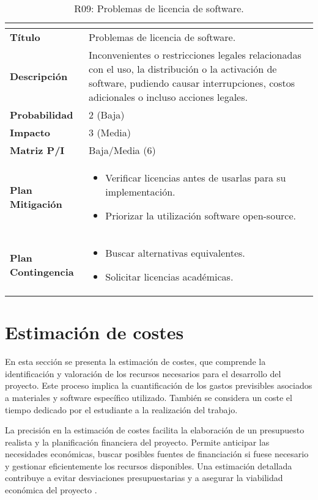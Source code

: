 \begin{table}[H]
\centering
\begin{tabular}{|>{\bfseries}l|p{10cm}|}
\hline
\rowcolor{lightgray}
\multicolumn{2}{|c|}{\textbf{Riesgo R09}} \\ \hline
Título & Problemas de licencia de software.\\ \hline
Descripción & Inconvenientes o restricciones legales relacionadas con el uso, la distribución o la activación de software, pudiendo causar interrupciones, costos adicionales o incluso acciones legales. \\ \hline
Probabilidad & 2 (Baja) \cellcolor{greenrisk} \\ \hline
Impacto & 3 (Media)  \cellcolor{yellowrisk}\\ \hline
Matriz P/I & Baja/Media (6)\\ \hline
Plan Mitigación & 
\begin{itemize}
\item Verificar licencias antes de usarlas para su implementación.
\item Priorizar la utilización software open-source.
\end{itemize} \\ \hline
Plan Contingencia & 
\begin{itemize}
\item Buscar alternativas equivalentes.
\item Solicitar licencias académicas.
\end{itemize} \\ \hline
\end{tabular}
\caption{R09: Problemas de licencia de software.}
\label{tab:R09}
\end{table}


\section{Estimación de costes}
En esta sección se presenta la estimación de costes, que comprende la identificación y valoración de los recursos necesarios para el desarrollo del proyecto. Este proceso implica la cuantificación de los gastos previsibles asociados a materiales y software específico utilizado. También se considera un coste el tiempo dedicado por el estudiante a la realización del trabajo.

La precisión en la estimación de costes facilita la elaboración de un presupuesto realista y la planificación financiera del proyecto. Permite anticipar las necesidades económicas, buscar posibles fuentes de financiación si fuese necesario y gestionar eficientemente los recursos disponibles. Una estimación detallada contribuye a evitar desviaciones presupuestarias y a asegurar la viabilidad económica del proyecto \cite{oliveros2011gestion}.

